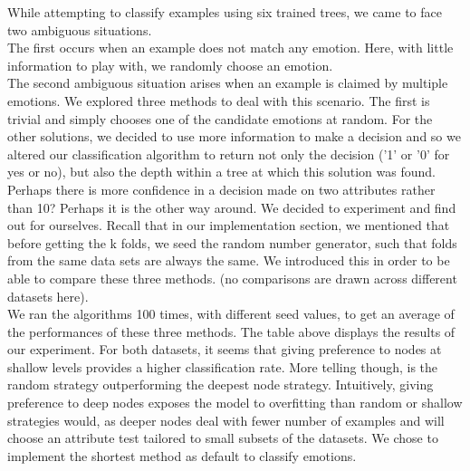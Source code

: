 While attempting to classify examples using six trained trees, we came to face two ambiguous situations.\\
The first occurs when an example does not match any emotion.
Here, with little information to play with, we randomly choose an emotion.\\
The second ambiguous situation arises when an example is claimed by multiple emotions.
We explored three methods to deal with this scenario.
The first is trivial and simply chooses one of the candidate emotions at random.
For the other solutions, we decided to use more information to make a decision and so we altered our classification algorithm
to return not only the decision ('1' or '0' for yes or no), but also the depth within a tree at which this solution was found.
Perhaps there is more confidence in a decision made on two attributes rather than 10? Perhaps it is the other way around.
We decided to experiment and find out for ourselves. Recall that in our implementation section, we mentioned that before getting
the k folds, we seed the random number generator, such that folds from the same data sets are always the same. We introduced this
in order to be able to compare these three methods. (no comparisons are drawn across different datasets here). \\






We ran the algorithms 100 times, with different seed values, to get an average of the performances of these three methods.
The table above displays the results of our experiment.
For both datasets, it seems that giving preference to nodes at shallow levels provides a higher classification rate.
More telling though, is the random strategy outperforming the deepest node strategy.
Intuitively, giving preference to deep nodes exposes the model to overfitting than random or shallow strategies would, as deeper nodes
deal with fewer number of examples and will choose an attribute test tailored to small subsets of the datasets.
We chose to implement the shortest method as default to classify emotions.

